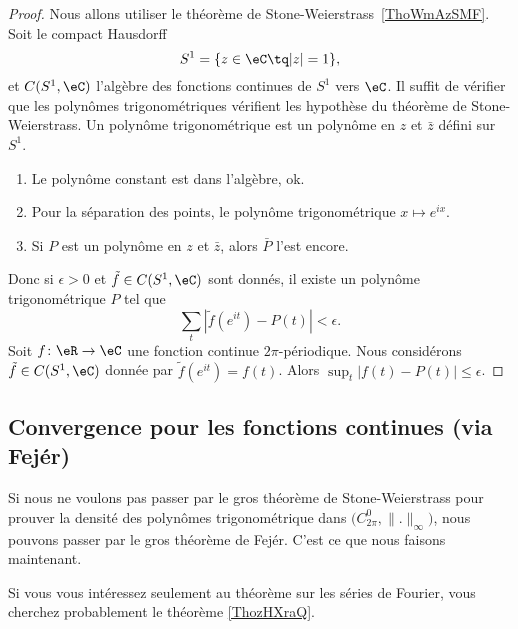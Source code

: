 \begin{proof}
    Nous allons utiliser le théorème de Stone-Weierstrass~\ref{ThoWmAzSMF}. Soit le compact Hausdorff
    \begin{equation}
        S^1=\{ z\in \eC\tq | z |=1 \},
    \end{equation}
    et \( C(S^1,\eC)\) l'algèbre des fonctions continues de \( S^1\) vers \( \eC\). Il suffit de vérifier que les polynômes trigonométriques vérifient les hypothèse du théorème de Stone-Weierstrass. Un polynôme trigonométrique est un polynôme en \( z\) et \( \bar z\) défini sur \( S^1\).
    \begin{enumerate}
        \item
            Le polynôme constant est dans l'algèbre, ok.
        \item
            Pour la séparation des points, le polynôme trigonométrique \( x\mapsto  e^{ix}\).
        \item
            Si \( P\) est un polynôme en \( z\) et \( \bar z\), alors \( \bar P\) l'est encore.
    \end{enumerate}
    Donc si \( \epsilon>0\) et \( \tilde f\in C(S^1,\eC)\) sont donnés, il existe un polynôme trigonométrique \( P\) tel que
    \begin{equation}
        \sum_t| \tilde f( e^{it})-P(t) |<\epsilon.
    \end{equation}
    Soit \( f\colon \eR\to \eC\) une fonction continue \( 2\pi\)-périodique. Nous considérons \( \tilde f\in C(S^1,\eC)\) donnée par \( \tilde f( e^{it})=f(t)\). Alors \( \sup_t| f(t)-P(t) |\leq \epsilon\).
\end{proof}



\subsection{Convergence pour les fonctions continues (via Fejér)}

Si nous ne voulons pas passer par le gros théorème de Stone-Weierstrass pour prouver la densité des polynômes trigonométrique dans \( \big( C^0_{2\pi},\| . \|_{\infty} \big)\), nous pouvons passer par le gros théorème de Fejér. C'est ce que nous faisons maintenant.

Si vous vous intéressez seulement au théorème sur les séries de Fourier, vous cherchez probablement le théorème \ref{ThozHXraQ}.

